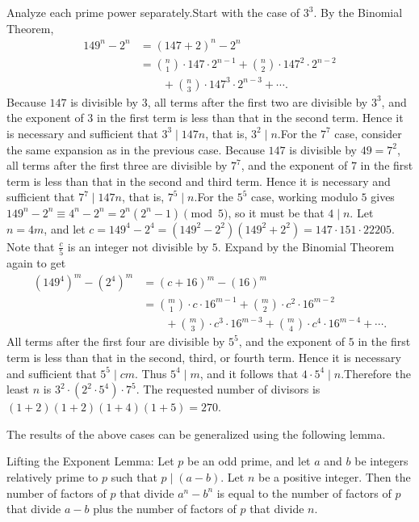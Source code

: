 \begin{enumerate}
Analyze each prime power separately.Start with the case of $3^3$. By the Binomial Theorem,
 \begin{align*} 		149^n - 2^n &= (147+2)^n - 2^n \\ 		&= \binom n1 \cdot 147 \cdot 2^{n-1} 		+ \binom n2 \cdot 147^2 \cdot 2^{n-2}\\ 		&\qquad+ \binom n3 \cdot 147^3 \cdot 2^{n-3} 		+ \cdots. 	\end{align*}
Because $147$ is divisible by $3$, all terms after the first two are divisible by $3^3$, and the exponent of $3$ in the first term is less than that in the second term. Hence it is necessary and sufficient that $3^3 \mid 147n$, that is, $3^2 \mid n$.For the $7^7$ case, consider the same expansion as in the previous case. Because $147$ is divisible by $49 = 7^2$, all terms after the first three are divisible by $7^7$, and the exponent of $7$ in the first term is less than that in the second and third term. Hence it is necessary and sufficient that $7^7 \mid 147n$, that is, $7^5 \mid n$.For the $5^5$ case, working modulo $5$ gives $149^n - 2^n \equiv 4^n - 2^n = 2^n(2^n-1) \pmod 5$, so it must be that $4 \mid n$. Let $n = 4m$, and let $c = 149^4 - 2^4 = (149^2-2^2)(149^2+2^2) = 147 \cdot 151 \cdot 22205$. Note that $\frac c5$ is an integer not divisible by $5$. Expand by the Binomial Theorem again to get
 \begin{align*} 		(149^4)^m - (2^4)^m &= (c+16)^m - (16)^m \\ 		&= \binom m1 \cdot c \cdot 16^{m-1} 		+ \binom m2 \cdot c^2 \cdot 16^{m-2} \\ 		&\qquad+ \binom m3 \cdot c^3 \cdot 16^{m-3} 		+ \binom m4 \cdot c^4 \cdot 16^{m-4} 		+ \cdots. 	\end{align*}
All terms after the first four are divisible by $5^5$, and the exponent of $5$ in the first term is less than that in the second, third, or fourth term. Hence it is necessary and sufficient that $5^5 \mid cm$. Thus $5^4 \mid m$, and it follows that $4 \cdot 5^4 \mid n$.Therefore the least $n$ is $3^2 \cdot (2^2 \cdot 5^4) \cdot 7^5$. The requested number of divisors is $(1+2)(1+2)(1+4)(1+5) = 270$.

 The results of the above cases can be generalized using the following lemma.

 Lifting the Exponent Lemma: Let $p$ be an odd prime, and let $a$ and $b$ be integers relatively prime to $p$ such that $p \mid (a-b)$. Let $n$ be a positive integer. Then the number of factors of $p$ that divide $a^n - b^n$ is equal to the number of factors of $p$ that divide $a-b$ plus the number of factors of $p$ that divide $n$.


\end{enumerate}
